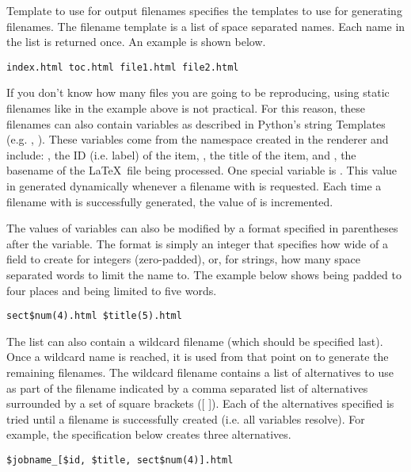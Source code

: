 \begin{configuration}{Template to use for output filenames}
specifies the templates to use for generating filenames.  
The filename template is a list of space separated names.  Each name 
in the list is returned once.  An example is shown below.

\begin{verbatim}
index.html toc.html file1.html file2.html
\end{verbatim}

If you don't know how many files you are going to be reproducing,
using static filenames like in the example above is not practical.
For this reason, these filenames can also contain variables as described in 
Python's string Templates (e.g. , ).  These variables
come from the namespace created in the renderer and include:
, the ID (i.e. label) of the item, , the title of the
item, and , the basename of the \LaTeX\ file being processed.  
One special variable is .  This value in generated dynamically 
whenever a filename with  is requested.  Each time a filename 
with  is successfully generated, the value of 
is incremented.

The values of variables can also be modified by a format specified
in parentheses after the variable.  The format is simply an integer
that specifies how wide of a field to create for integers 
(zero-padded), or, for strings, how many space separated words
to limit the name to.  The example below shows  being padded
to four places and  being limited to five words.

\begin{verbatim}
sect$num(4).html $title(5).html
\end{verbatim}

The list can also contain a wildcard filename (which should be 
specified last).  Once a wildcard name is reached, it is 
used from that point on to generate the remaining filenames.  
The wildcard filename contains a list of alternatives to use as
part of the filename indicated by a comma separated list of 
alternatives surrounded by a set of square brackets ([ ]).
Each of the alternatives specified is tried until a filename is
successfully created (i.e. all variables resolve).  For example,
the specification below creates three alternatives.

\begin{verbatim}
$jobname_[$id, $title, sect$num(4)].html
\end{verbatim}


\end{configuration}
